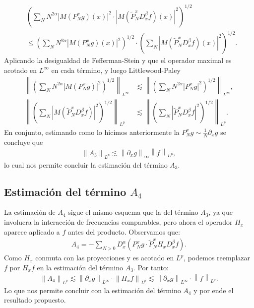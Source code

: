 \documentclass{aleph-revista}
\renewcommand{\tilde}{\widetilde}
\providecommand{\norm}[1]{\left\|#1\right\|}
\begin{document}
  \begin{align*}
    &\left( \sum_{N} N^{2\alpha} |M(P_N^x g)(x)|^2 \cdot |M(\tilde{P}_N^x D_x^\beta f)(x)|^2 \right)^{1/2} \\
    &\leq \left( \sum_N N^{2\alpha} |M(P_N^x g)(x)|^2 \right)^{1/2} \cdot \left( \sum_N |M(\tilde{P}_N^x D_x^\beta f)(x)|^2 \right)^{1/2}.
  \end{align*}
  Aplicando la desigualdad de Fefferman-Stein y que el operador maximal es acotado en $L^{\infty}$ en cada término, y luego Littlewood-Paley
  \begin{align*}
    \norm{\left( \sum_N N^{2\alpha} |M(P_N^x g)|^2 \right)^{1/2}}_{L^\infty} &\lesssim \norm{\left( \sum_N N^{2\alpha} |P_N^x g|^2 \right)^{1/2}}_{L^\infty}, \\
    \norm{\left( \sum_N |M(\tilde{P}_N^x D_x^\beta f)|^2 \right)^{1/2}}_{L^p} &\lesssim \norm{\left( \sum_N |\tilde{P}_N^x D_x^\beta f|^2 \right)^{1/2}}_{L^p}.
  \end{align*}
  En conjunto, estimando como lo hicimos anteriormente la $P_{N}^{x}g\sim \frac{1}{N}\partial_{x}g$ se concluye que
  \begin{align*}
    \norm{A_3}_{L^p} \lesssim \norm{\partial_{x}g}_{\infty}\norm{f}_{L^p},
  \end{align*}
  lo cual nos permite concluir la estimación del término $A_3$.

\subsection*{Estimación del término $A_4$}
  La estimación de $A_4$ sigue el mismo esquema que la del término $A_3$, ya que involucra la interacción de frecuencias comparables, pero ahora el operador $H_x$ aparece aplicado a $f$ antes del producto. Observamos que:
  \begin{align*}
    A_4 = - \sum_{N > 0} D_x^\alpha (P_N^x g \cdot \tilde{P}_N^x H_x D_x^\beta f).
  \end{align*}
  Como $H_x$ conmuta con las proyecciones y es acotado en $L^p$, podemos reemplazar $f$ por $H_x f$ en la estimación del término $A_3$. Por tanto:
  \begin{align*}
    \norm{A_4}_{L^p} \lesssim \norm{ \partial_x g}_{L^\infty} \cdot \norm{ H_x f}_{L^p} \lesssim \norm{\partial_x g}_{L^\infty} \cdot \norm{f}_{L^p}.
  \end{align*}
  Lo que nos permite concluir con la estimación del término $A_4$ y por ende el resultado propuesto. 
\end{document}
